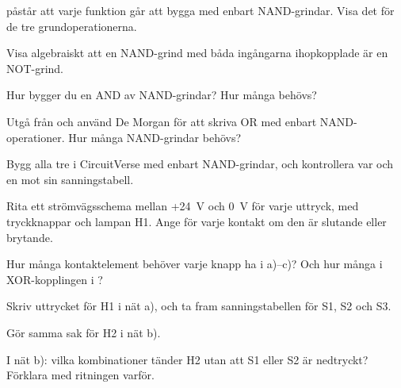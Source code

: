 \label{c2:ex:9}
 påstår att varje funktion går att bygga med enbart NAND-grindar. Visa det för de tre
grundoperationerna.
\begin{parts}
  \item Visa algebraiskt att en NAND-grind med båda ingångarna ihopkopplade är en NOT-grind.
  \item Hur bygger du en AND av NAND-grindar? Hur många behövs?
  \item Utgå från \mbox{} och använd De Morgan för att skriva OR med
    enbart NAND-operationer. Hur många NAND-grindar behövs?
  \item Bygg alla tre i CircuitVerse med enbart NAND-grindar, och kontrollera var och en mot sin
    sanningstabell.
\end{parts}

\label{c2:ex:10}
Rita ett strömvägsschema mellan +24~V och 0~V för varje uttryck, med tryckknappar och lampan H1.
Ange för varje kontakt om den är slutande eller brytande.
\begin{parts}
  \item {}
  \item {}
  \item {}
  \item Hur många kontaktelement behöver varje knapp ha i a)--c)? Och hur många i XOR-kopplingen i
    ?
\end{parts}

\label{c2:ex:11}


\begin{parts}
  \item Skriv uttrycket för H1 i nät a), och ta fram sanningstabellen för S1, S2 och S3.
  \item Gör samma sak för H2 i nät b).
  \item I nät b): vilka kombinationer tänder H2 utan att S1 eller S2 är nedtryckt? Förklara med
    ritningen varför.
\end{parts}

